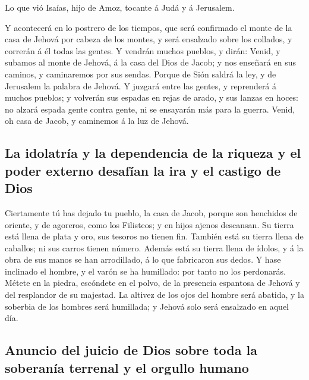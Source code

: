  Lo que vió Isaías, hijo de Amoz, tocante á Judá y á
Jerusalem.

 Y acontecerá en lo postrero de los tiempos, que será
confirmado el monte de la casa de Jehová por cabeza de los montes, y
será ensalzado sobre los collados, y correrán á él todas las gentes.
 Y vendrán muchos pueblos, y dirán: Venid, y subamos al
monte de Jehová, á la casa del Dios de Jacob; y nos enseñará en sus
caminos, y caminaremos por sus sendas. Porque de Sión saldrá la ley, y
de Jerusalem la palabra de Jehová.  Y juzgará entre las
gentes, y reprenderá á muchos pueblos; y volverán sus espadas en rejas
de arado, y sus lanzas en hoces: no alzará espada gente contra gente, ni
se ensayarán más para la guerra.  Venid, oh casa de Jacob,
y caminemos á la luz de Jehová.

\hypertarget{la-idolatruxeda-y-la-dependencia-de-la-riqueza-y-el-poder-externo-desafuxedan-la-ira-y-el-castigo-de-dios}{%
\subsection{La idolatría y la dependencia de la riqueza y el poder
externo desafían la ira y el castigo de
Dios}\label{la-idolatruxeda-y-la-dependencia-de-la-riqueza-y-el-poder-externo-desafuxedan-la-ira-y-el-castigo-de-dios}}

 Ciertamente tú has dejado tu pueblo, la casa de Jacob,
porque son henchidos de oriente, y de agoreros, como los Filisteos; y en
hijos ajenos descansan.  Su tierra está llena de plata y
oro, sus tesoros no tienen fin. También está su tierra llena de
caballos; ni sus carros tienen número.  Además está su
tierra llena de ídolos, y á la obra de sus manos se han arrodillado, á
lo que fabricaron sus dedos.  Y hase inclinado el hombre,
y el varón se ha humillado: por tanto no los perdonarás. 
Métete en la piedra, escóndete en el polvo, de la presencia espantosa de
Jehová y del resplandor de su majestad.  La altivez de
los ojos del hombre será abatida, y la soberbia de los hombres será
humillada; y Jehová solo será ensalzado en aquel día.

\hypertarget{anuncio-del-juicio-de-dios-sobre-toda-la-soberanuxeda-terrenal-y-el-orgullo-humano}{%
\subsection{Anuncio del juicio de Dios sobre toda la soberanía terrenal
y el orgullo
humano}\label{anuncio-del-juicio-de-dios-sobre-toda-la-soberanuxeda-terrenal-y-el-orgullo-humano}}

